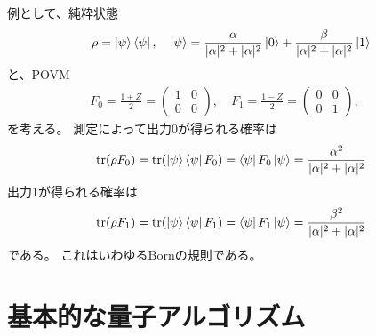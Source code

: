 \documentclass[]{ltjsarticle}
\DeclareMathOperator{\tr}{tr}
\begin{document}
例として、純粋状態
\begin{align}
    \rho = \ket{\psi}\bra{\psi}, \quad 
    \ket{\psi} 
    =
    \frac{\alpha}{|\alpha|^2+|\alpha|^2} 
    \ket{0}   
    +
    \frac{\beta}{|\alpha|^2+|\alpha|^2}
    \ket{1}   
\end{align}
と、POVM
\begin{align}
    F_0 = \frac{1 + Z}{2}
    = \begin{pmatrix}
        1 & 0 \\ 0 & 0
    \end{pmatrix}, \quad 
    F_1 = \frac{1 - Z}{2} 
    = \begin{pmatrix}
        0 & 0 \\ 0 & 1
    \end{pmatrix}, \quad 
\end{align}
を考える。
測定によって出力0が得られる確率は
\begin{align}
    \tr(\rho F_0)
    =
    \tr(\ket{\psi}\bra{\psi} F_0)
    =
    \bra{\psi}F_0\ket{\psi}
    =
    \frac{\alpha^2}{|\alpha|^2+|\alpha|^2}
\end{align}
出力1が得られる確率は
\begin{align}
    \tr(\rho F_1)
    =
    \tr(\ket{\psi}\bra{\psi} F_1)
    =
    \bra{\psi}F_1\ket{\psi}
    =
    \frac{\beta^2}{|\alpha|^2+|\alpha|^2}
\end{align}
である。
これはいわゆるBornの規則である。


\section{基本的な量子アルゴリズム}
\end{document}
